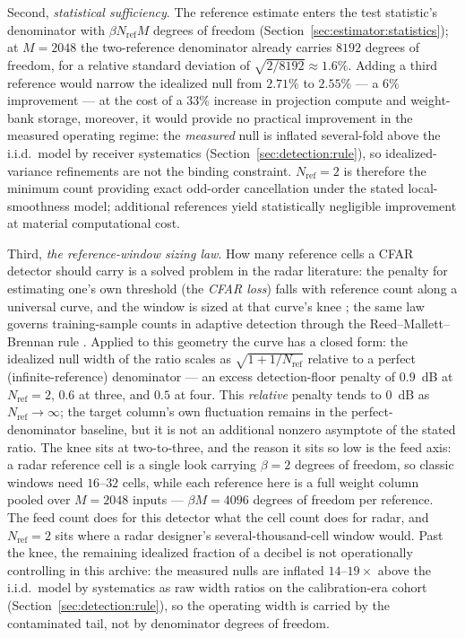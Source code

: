 \begin{enumerate}
    Second, \emph{statistical sufficiency}. The reference estimate enters the test statistic's denominator with $\beta N_{\text{ref}} M$ degrees of freedom (Section~\ref{sec:estimator:statistics}); at $M = 2048$ the two-reference denominator already carries $8192$ degrees of freedom, for a relative standard deviation of $\sqrt{2/8192} \approx 1.6\%$. Adding a third reference would narrow the idealized null from $2.71\%$ to $2.55\%$ --- a $6\%$ improvement --- at the cost of a $33\%$ increase in projection compute and weight-bank storage, moreover, it would provide no practical improvement in the measured operating regime: the \emph{measured} null is inflated several-fold above the i.i.d.\ model by receiver systematics (Section~\ref{sec:detection:rule}), so idealized-variance refinements are not the binding constraint. $N_{\text{ref}} = 2$ is therefore the minimum count providing exact odd-order cancellation under the stated local-smoothness model; additional references yield statistically negligible improvement at material computational cost.

    Third, \emph{the reference-window sizing law}. How many reference cells a CFAR detector should carry is a solved problem in the radar literature: the penalty for estimating one's own threshold (the \emph{CFAR loss}) falls with reference count along a universal curve, and the window is sized at that curve's knee \cite{finn1968,gandhi1988}; the same law governs training-sample counts in adaptive detection through the Reed--Mallett--Brennan rule \cite{reed1974}. Applied to this geometry the curve has a closed form: the idealized null width of the ratio scales as $\sqrt{1 + 1/N_{\text{ref}}}$ relative to a perfect (infinite-reference) denominator --- an excess detection-floor penalty of $0.9$~dB at $N_{\text{ref}} = 2$, $0.6$ at three, and $0.5$ at four. This \emph{relative} penalty tends to $0$~dB as $N_{\text{ref}} \rightarrow \infty$; the target column's own fluctuation remains in the perfect-denominator baseline, but it is not an additional nonzero asymptote of the stated ratio. The knee sits at two-to-three, and the reason it sits so low is the feed axis: a radar reference cell is a single look carrying $\beta = 2$ degrees of freedom, so classic windows need $16$--$32$ cells, while each reference here is a full weight column pooled over $M = 2048$ inputs --- $\beta M = 4096$ degrees of freedom per reference. The feed count does for this detector what the cell count does for radar, and $N_{\text{ref}} = 2$ sits where a radar designer's several-thousand-cell window would. Past the knee, the remaining idealized fraction of a decibel is not operationally controlling in this archive: the measured nulls are inflated $14$--$19\times$ above the i.i.d.\ model by systematics as raw width ratios on the calibration-era cohort (Section~\ref{sec:detection:rule}), so the operating width is carried by the contaminated tail, not by denominator degrees of freedom.


\end{enumerate}
